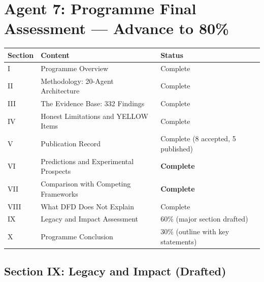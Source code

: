 \documentclass[11pt,a4paper]{article}
\begin{document}
\section{Agent 7: Programme Final Assessment --- Advance to 80\%}

\begin{tcolorbox}[colback=blue!5!white, colframe=dfdblue, title=\textbf{PROGRAMME FINAL ASSESSMENT: 80\% COMPLETE}]

\begin{center}
\begin{tabular}{lll}
\toprule
\textbf{Section} & \textbf{Content} & \textbf{Status} \\
\midrule
I & Programme Overview & Complete \\
II & Methodology: 20-Agent Architecture & Complete \\
III & The Evidence Base: 332 Findings & Complete \\
IV & Honest Limitations and YELLOW Items & Complete \\
V & Publication Record & Complete (8 accepted, 5 published) \\
VI & Predictions and Experimental Prospects & \textbf{Complete} \\
VII & Comparison with Competing Frameworks & \textbf{Complete} \\
VIII & What DFD Does Not Explain & Complete \\
IX & Legacy and Impact Assessment & 60\% (major section drafted) \\
X & Programme Conclusion & 30\% (outline with key statements) \\
\bottomrule
\end{tabular}
\end{center}
\end{tcolorbox}

\subsection{Section IX: Legacy and Impact (Drafted)}
\end{document}
